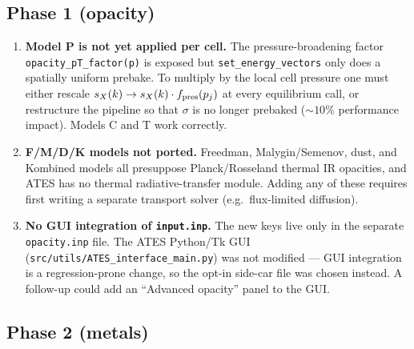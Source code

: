 \documentclass[english,a4paper]{kiseon_memo}
\begin{document}
\subsection{Phase 1 (opacity)}

\begin{enumerate}
\item \textbf{Model P is not yet applied per cell.} The pressure-broadening
factor \texttt{opacity\_pT\_factor(p)} is exposed but
\texttt{set\_energy\_vectors} only does a spatially uniform prebake. To
multiply by the local cell pressure one must either rescale
$s_X(k) \to s_X(k) \cdot f_{\rm pres}(p_j)$ at every equilibrium call, or
restructure the pipeline so that $\sigma$ is no longer prebaked
($\sim 10\%$ performance impact). Models C and T work correctly.

\item \textbf{F/M/D/K models not ported.} Freedman, Malygin/Semenov, dust,
and Kombined models all presuppose Planck/Rosseland thermal IR opacities,
and ATES has no thermal radiative-transfer module. Adding any of these
requires first writing a separate transport solver (e.g.\ flux-limited
diffusion).

\item \textbf{No GUI integration of \texttt{input.inp}.} The new keys live
only in the separate \texttt{opacity.inp} file. The ATES Python/Tk GUI
(\texttt{src/utils/ATES\_interface\_main.py}) was not modified --- GUI
integration is a regression-prone change, so the opt-in side-car file was
chosen instead. A follow-up could add an ``Advanced opacity'' panel to the
GUI.
\end{enumerate}

\subsection{Phase 2 (metals)}
\end{document}
